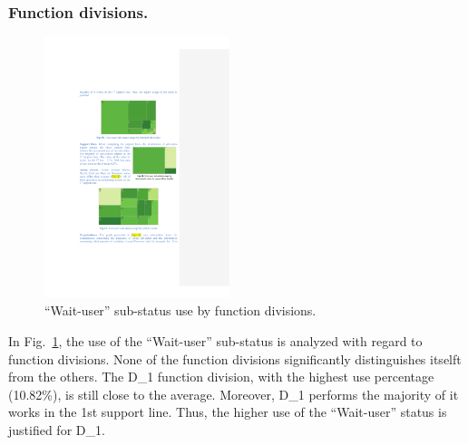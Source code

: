 \documentclass[lnbip]{svmultln}
\begin{document}
\subsubsection{Function divisions.}
\begin{figure}
  \vspace{-10pt}
  \begin{center}
    \includegraphics[width=0.48\textwidth]{"figs/pic 32"}
  \end{center}
  \vspace{-10pt}
  \caption{``Wait-user'' sub-status use by function divisions.}
  \label{fig:waitUseFunctions}
  \vspace{-10pt}
\end{figure}
In Fig.~\ref{fig:waitUseFunctions}, the use of the ``Wait-user'' sub-status is analyzed with regard to function divisions. None of the function divisions significantly distinguishes itselft from the others. The D\_1 function division, with the highest use percentage (10.82\%), is still close to the average. Moreover, D\_1 performs the majority of it works in the 1st support line. Thus, the higher use of the ``Wait-user'' status is justified for D\_1.
\end{document}
